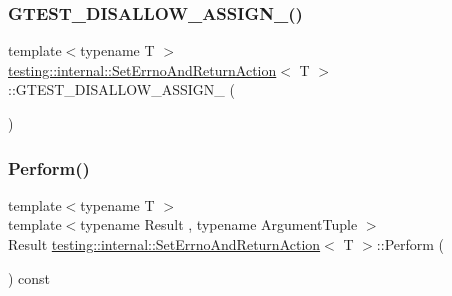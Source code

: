 \mbox{\label{classtesting_1_1internal_1_1_set_errno_and_return_action_a18906b36848b148a809907d105823ccc}} 
\subsubsection{\texorpdfstring{GTEST\_DISALLOW\_ASSIGN\_()}{GTEST\_DISALLOW\_ASSIGN\_()}\hspace{0.1cm}{\footnotesize\ttfamily [3/3]}}
{\footnotesize\ttfamily template$<$typename T $>$ \\
\mbox{\hyperlink{classtesting_1_1internal_1_1_set_errno_and_return_action}{testing\+::internal\+::\+Set\+Errno\+And\+Return\+Action}}$<$ T $>$\+::G\+T\+E\+S\+T\+\_\+\+D\+I\+S\+A\+L\+L\+O\+W\+\_\+\+A\+S\+S\+I\+G\+N\+\_\+ (\begin{DoxyParamCaption}\item[{\mbox{\hyperlink{classtesting_1_1internal_1_1_set_errno_and_return_action}{Set\+Errno\+And\+Return\+Action}}$<$ T $>$}]{ }\end{DoxyParamCaption})\hspace{0.3cm}{\ttfamily [private]}}

\mbox{\label{classtesting_1_1internal_1_1_set_errno_and_return_action_a44025d0d124cab72878bf6bdb12c3693}} 
\subsubsection{\texorpdfstring{Perform()}{Perform()}\hspace{0.1cm}{\footnotesize\ttfamily [1/3]}}
{\footnotesize\ttfamily template$<$typename T $>$ \\
template$<$typename Result , typename Argument\+Tuple $>$ \\
Result \mbox{\hyperlink{classtesting_1_1internal_1_1_set_errno_and_return_action}{testing\+::internal\+::\+Set\+Errno\+And\+Return\+Action}}$<$ T $>$\+::Perform (\begin{DoxyParamCaption}\item[{const Argument\+Tuple \&}]{ }\end{DoxyParamCaption}) const\hspace{0.3cm}{\ttfamily [inline]}}


